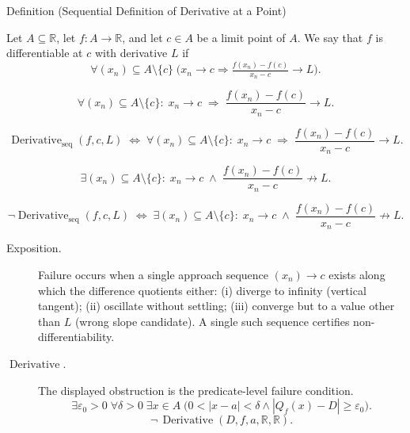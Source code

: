 \begin{definitionbox}{Definition (Sequential Definition of Derivative at a Point)}
\begin{definition}
\label{def:sequential-definition-of-derivative-at-a-point}
Let $A \subseteq \mathbb{R}$, let $f : A \to \mathbb{R}$, and let $c \in A$ be a limit point of $A$. We say that $f$ is differentiable at $c$ with derivative $L$ if
\[
\forall (x_n) \subseteq A \setminus \{c\}\;
\bigl(x_n \to c \Rightarrow \tfrac{f(x_n)-f(c)}{x_n-c} \to L\bigr).
\]
\end{definition}
\end{definitionbox}

\begin{remark*}
\[
\forall (x_n) \subseteq A \setminus \{c\}:\;
x_n \to c \;\Rightarrow\; \frac{f(x_n)-f(c)}{x_n-c} \to L.
\]
\end{remark*}

\begin{remark*}
\[
\operatorname{Derivative}_{\mathrm{seq}}(f,c,L)
\;\Longleftrightarrow\;
\forall (x_n)\subseteq A\setminus\{c\}:\;
x_n\to c \;\Rightarrow\; \frac{f(x_n)-f(c)}{x_n-c}\to L.
\]
\end{remark*}

\begin{remark*}
\[
\exists (x_n) \subseteq A \setminus \{c\}:\;
x_n \to c \;\land\; \frac{f(x_n)-f(c)}{x_n-c} \not\to L.
\]
\end{remark*}

\begin{remark*}
\[
\neg\operatorname{Derivative}_{\mathrm{seq}}(f,c,L)
\;\Longleftrightarrow\;
\exists (x_n)\subseteq A\setminus\{c\}:\;
x_n\to c \;\land\; \frac{f(x_n)-f(c)}{x_n-c}\not\to L.
\]
\end{remark*}

\begin{remark*}
\begin{description}
  \item[Exposition.]
Failure occurs when a single approach sequence $(x_n) \to c$ exists along which the difference quotients either: (i) diverge to infinity (vertical tangent); (ii) oscillate without settling; (iii) converge but to a value other than $L$ (wrong slope candidate). A single such sequence certifies non-differentiability.


  \item[\(\operatorname{Derivative}.\)]
  The displayed obstruction is the predicate-level failure condition.
  \[
  \exists\varepsilon_0>0\;\forall\delta>0\;\exists x\in A\;\bigl(0<|x-a|<\delta\land |Q_f(x)-D|\ge\varepsilon_0\bigr).
  \]
  \[
  \neg\,\operatorname{Derivative}(D,f,a,\mathbb{R},\mathbb{R}).
  \]
\end{description}
\end{remark*}

